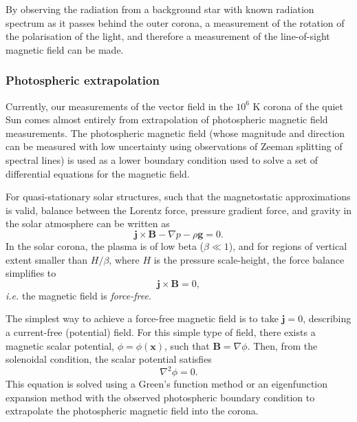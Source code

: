 \documentclass[12pt]{../style-files/ociamthesis}
\begin{document}
By observing the radiation from a background star with known radiation spectrum as it passes behind the outer corona, a measurement of the rotation of the polarisation of the light, and therefore a measurement of the line-of-sight magnetic field can be made.


\subsubsection{Photospheric extrapolation}
Currently, our measurements of the vector field in the $10^6$ K corona of the quiet Sun comes almost entirely from extrapolation of photospheric magnetic field measurements. The photospheric magnetic field (whose magnitude and direction can be measured with low uncertainty using observations of Zeeman splitting of spectral lines) is used as a lower boundary condition used to solve a set of differential equations for the magnetic field.

For quasi-stationary solar structures, such that the magnetostatic approximations is valid, balance between the Lorentz force, pressure gradient force, and gravity in the solar atmosphere can be written as
\begin{equation}
\mathbf{j} \times \mathbf{B} - \nabla p - \rho \mathbf{g} = 0.
\end{equation}
In the solar corona, the plasma is of low beta ($\beta \ll 1$), and for regions of vertical extent smaller than $H/\beta$, where $H$ is the pressure scale-height, the force balance simplifies to 
\begin{equation}
\mathbf{j} \times \mathbf{B} = 0,
\end{equation}
\textit{i.e.} the magnetic field is \textit{force-free}.

The simplest way to achieve a force-free magnetic field is to take $\mathbf{j} = 0$, describing a current-free (potential) field. For this simple type of field, there exists a magnetic scalar potential, $\phi = \phi(\mathbf{x})$, such that $\mathbf{B} = \nabla\phi$. Then, from the solenoidal condition, the scalar potential satisfies
\begin{equation}
\nabla^2 \phi = 0.
\end{equation}
This equation is solved using a Green's function method or an eigenfunction expansion method with the observed photospheric boundary condition to extrapolate the photospheric magnetic field into the corona.
\end{document}
